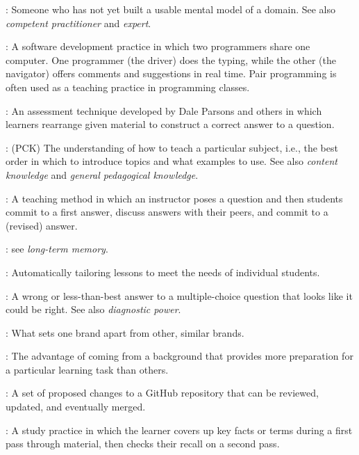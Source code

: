 \begin{description}
: Someone who has not yet built a usable mental model of
a domain. See also \emph{competent practitioner} and \emph{expert}.

: A software development practice in
which two programmers share one computer. One programmer (the driver) does the
typing, while the other (the navigator) offers comments and suggestions in real
time. Pair programming is often used as a teaching practice in programming
classes.

: An assessment technique developed by
Dale Parsons and others in which learners rearrange given material to construct
a correct answer to a question.

: (PCK)
The understanding of how to teach a particular subject, i.e., the best order in
which to introduce topics and what examples to use. See also \emph{content
  knowledge} and \emph{general pedagogical knowledge}.

: A teaching method in which an
instructor poses a question and then students commit to a first answer, discuss
answers with their peers, and commit to a (revised) answer.

: see \emph{long-term memory}.

: Automatically tailoring
lessons to meet the needs of individual students.

: A wrong or less-than-best
answer to a multiple-choice question that looks like it could be right. See also
\emph{diagnostic power}.

: What sets one brand apart from other,
similar brands.

: The advantage of coming
from a background that provides more preparation for a particular learning task
than others.

: A set of proposed changes to a GitHub
repository that can be reviewed, updated, and eventually merged.

: A study practice in which
the learner covers up key facts or terms during a first pass through material,
then checks their recall on a second pass.


\end{description}
